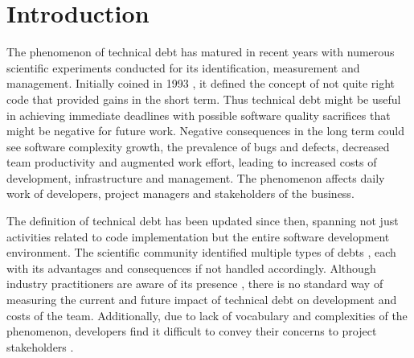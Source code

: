 \section{Introduction}
\label{introduction}

The phenomenon of technical debt has matured in recent years with numerous
scientific experiments conducted for its identification, measurement and
management. Initially coined in 1993 \cite{Cunningham1993}, it defined the
concept of not quite right code that provided gains in the short term. Thus
technical debt might be useful in achieving immediate deadlines with possible
software quality sacrifices that might be negative for future work. Negative
consequences in the long term could see software complexity growth, the
prevalence of bugs and defects, decreased team productivity and augmented work
effort, leading to increased costs of development, infrastructure and
management. The phenomenon affects daily work of developers, project managers
and stakeholders of the business.

The definition of technical debt has been updated since then, spanning not just
activities related to code implementation but the entire software development
environment. The scientific community identified multiple types of debts
\cite{Li2015}, each with its advantages and consequences if not handled
accordingly. Although industry practitioners are aware of its presence
\cite{Codabux2013} \cite{Lim2012}, there is no standard way of measuring the
current and future impact of technical debt on development and costs of the
team. Additionally, due to lack of vocabulary and complexities of the
phenomenon, developers find it difficult to convey their concerns to project
stakeholders \cite{Kruchten2012}.

